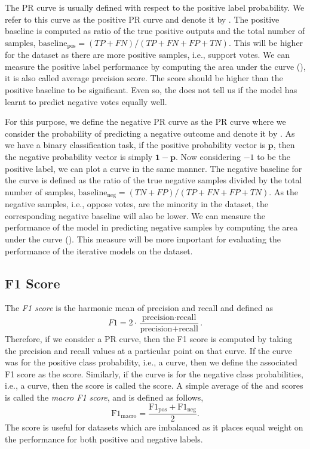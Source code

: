 The PR curve is usually defined with respect to the positive label probability.
We refer to this curve as the positive PR curve and denote it by \posPR.
The positive baseline is computed as ratio of the true positive outputs and the total number of samples, $\text{baseline}_{\text{pos}} = (TP+FN)/(TP+FN+FP+TN)$.
This will be higher for the \wikirfa dataset as there are more positive samples, i.e., support votes.
We can measure the positive label performance by computing the area under the \posPR curve (\aucposPR), it is also called average precision score.
The \aucposPR score should be higher than the positive baseline to be significant.
Even so, the \aucposPR does not tell us if the model has learnt to predict negative votes equally well.

For this purpose, we define the negative PR curve as the PR curve where we consider the probability of predicting a negative outcome and denote it by \negPR.
As we have a binary classification task, if the positive probability vector is $\mathbf{p}$, then the negative probability vector is simply $\mathbf{1}-\mathbf{p}$.
Now considering $-1$ to be the positive label, we can plot a \negPR curve in the same manner.
The negative baseline for the \negPR curve is defined as the ratio of the true negative samples divided by the total number of samples, $\text{baseline}_{\text{neg}} = (TN+FP)/(TP+FN+FP+TN)$.
As the negative samples, i.e., oppose votes, are the minority in the \wikirfa dataset, the corresponding negative baseline will also be lower.
We can measure the performance of the model in predicting negative samples by computing the area under the \negPR curve (\aucnegPR).
This measure will be more important for evaluating the performance of the iterative models on the \wikirfa dataset.


\subsection{F1 Score}
The \textit{F1 score} is the harmonic mean of precision and recall and defined as 
\[
    F1 = 2\cdot\frac{\text{precision}\cdot\text{recall}}{\text{precision}+\text{recall}}.
\]
Therefore, if we consider a PR curve, then the F1 score is computed by taking the precision and recall values at a particular point on that curve.
If the curve was for the positive class probability, i.e., a \posPR curve, then we define the associated F1 score as the \posF score.
Similarly, if the curve is for the negative class probabilities, i.e., a \negPR curve, then the score is called the \negF score.
A simple average of the \posF and \negF scores is called the \textit{macro F1 score}, and is defined as follows,
\[ 
    \text{F1}_{\text{macro}} = \frac{\text{F1}_{\text{pos}}+\text{F1}_{\text{neg}}}{2}.
\]
The \macroF score is useful for datasets which are imbalanced as it places equal weight on the performance for both positive and negative labels.

